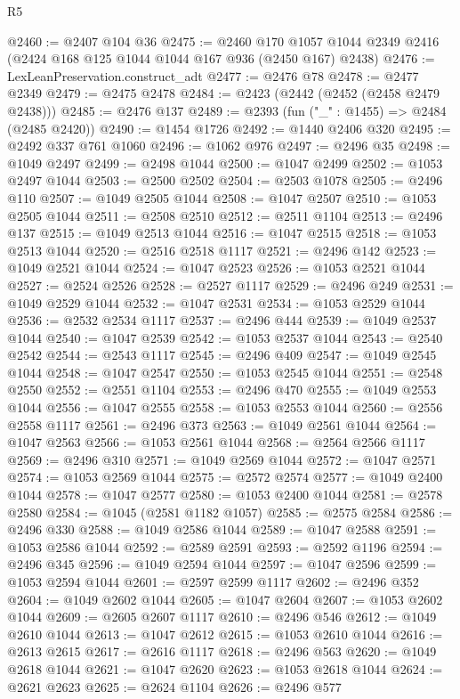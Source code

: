 \begin{lexlean}{R5}
\begin{coremodule}
@2460 := @2407 @104 @36
@2475 := @2460
    @170
    @1057
    @1044
    @2349
    @2416
    (@2424 @168 @125 @1044 @1044 @167 @936 (@2450 @167) @2438)
@2476 := LexLeanPreservation.construct_adt
@2477 := @2476 @78
@2478 := @2477 @2349
@2479 := @2475 @2478
@2484 := @2423 (@2442 (@2452 (@2458 @2479 @2438)))
@2485 := @2476 @137
@2489 := @2393 (fun ("_" : @1455) => @2484 (@2485 @2420))
@2490 := @1454 @1726
@2492 := @1440 @2406 @320
@2495 := @2492 @337 @761 @1060
@2496 := @1062 @976
@2497 := @2496 @35
@2498 := @1049 @2497
@2499 := @2498 @1044
@2500 := @1047 @2499
@2502 := @1053 @2497 @1044
@2503 := @2500 @2502
@2504 := @2503 @1078
@2505 := @2496 @110
@2507 := @1049 @2505 @1044
@2508 := @1047 @2507
@2510 := @1053 @2505 @1044
@2511 := @2508 @2510
@2512 := @2511 @1104
@2513 := @2496 @137
@2515 := @1049 @2513 @1044
@2516 := @1047 @2515
@2518 := @1053 @2513 @1044
@2520 := @2516 @2518 @1117
@2521 := @2496 @142
@2523 := @1049 @2521 @1044
@2524 := @1047 @2523
@2526 := @1053 @2521 @1044
@2527 := @2524 @2526
@2528 := @2527 @1117
@2529 := @2496 @249
@2531 := @1049 @2529 @1044
@2532 := @1047 @2531
@2534 := @1053 @2529 @1044
@2536 := @2532 @2534 @1117
@2537 := @2496 @444
@2539 := @1049 @2537 @1044
@2540 := @1047 @2539
@2542 := @1053 @2537 @1044
@2543 := @2540 @2542
@2544 := @2543 @1117
@2545 := @2496 @409
@2547 := @1049 @2545 @1044
@2548 := @1047 @2547
@2550 := @1053 @2545 @1044
@2551 := @2548 @2550
@2552 := @2551 @1104
@2553 := @2496 @470
@2555 := @1049 @2553 @1044
@2556 := @1047 @2555
@2558 := @1053 @2553 @1044
@2560 := @2556 @2558 @1117
@2561 := @2496 @373
@2563 := @1049 @2561 @1044
@2564 := @1047 @2563
@2566 := @1053 @2561 @1044
@2568 := @2564 @2566 @1117
@2569 := @2496 @310
@2571 := @1049 @2569 @1044
@2572 := @1047 @2571
@2574 := @1053 @2569 @1044
@2575 := @2572 @2574
@2577 := @1049 @2400 @1044
@2578 := @1047 @2577
@2580 := @1053 @2400 @1044
@2581 := @2578 @2580
@2584 := @1045 (@2581 @1182 @1057)
@2585 := @2575 @2584
@2586 := @2496 @330
@2588 := @1049 @2586 @1044
@2589 := @1047 @2588
@2591 := @1053 @2586 @1044
@2592 := @2589 @2591
@2593 := @2592 @1196
@2594 := @2496 @345
@2596 := @1049 @2594 @1044
@2597 := @1047 @2596
@2599 := @1053 @2594 @1044
@2601 := @2597 @2599 @1117
@2602 := @2496 @352
@2604 := @1049 @2602 @1044
@2605 := @1047 @2604
@2607 := @1053 @2602 @1044
@2609 := @2605 @2607 @1117
@2610 := @2496 @546
@2612 := @1049 @2610 @1044
@2613 := @1047 @2612
@2615 := @1053 @2610 @1044
@2616 := @2613 @2615
@2617 := @2616 @1117
@2618 := @2496 @563
@2620 := @1049 @2618 @1044
@2621 := @1047 @2620
@2623 := @1053 @2618 @1044
@2624 := @2621 @2623
@2625 := @2624 @1104
@2626 := @2496 @577

\end{coremodule}
\end{lexlean}
